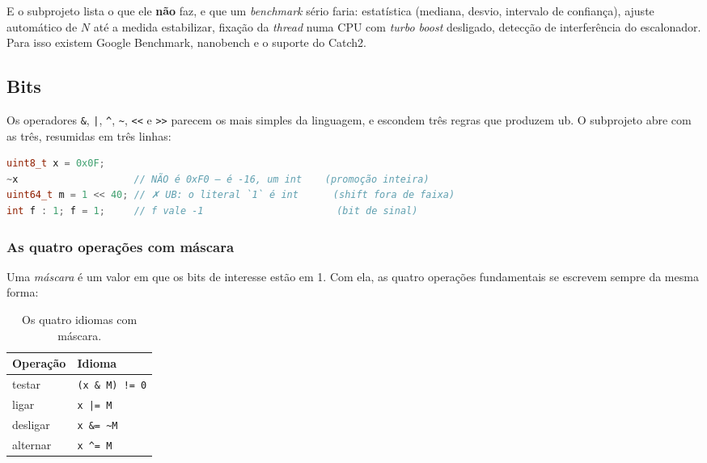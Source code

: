 E o subprojeto lista o que ele \textbf{não} faz, e que um \emph{benchmark} sério
faria: estatística (mediana, desvio, intervalo de confiança), ajuste automático
de $N$ até a medida estabilizar, fixação da \emph{thread} numa CPU com
\emph{turbo boost} desligado, detecção de interferência do escalonador. Para
isso existem Google Benchmark, nanobench e o suporte do Catch2.

\subsection{Bits}
\label{sec:bits}

Os operadores \texttt{\&}, \texttt{|}, \texttt{\textasciicircum},
\texttt{\textasciitilde}, \texttt{<<} e \texttt{>>} parecem os mais simples da
linguagem, e escondem três regras que produzem \gls{ub}. O subprojeto
 abre com as três, resumidas em três linhas:

\begin{lstlisting}[style=bt, language=C++,
    caption={As três armadilhas dos operadores de bit.}]
uint8_t x = 0x0F;
~x                    // NÃO é 0xF0 — é -16, um int    (promoção inteira)
uint64_t m = 1 << 40; // ✗ UB: o literal `1` é int      (shift fora de faixa)
int f : 1; f = 1;     // f vale -1                       (bit de sinal)
\end{lstlisting}

\subsubsection{As quatro operações com máscara}

Uma \emph{máscara} é um valor em que os bits de interesse estão em 1. Com ela,
as quatro operações fundamentais se escrevem sempre da mesma forma:

\begin{table}[htbp]
\centering
\caption{Os quatro idiomas com máscara.}
\label{tab:mascaras}
\footnotesize
\begin{tabular}{@{}ll@{}}
\toprule
\textbf{Operação} & \textbf{Idioma} \\
\midrule
testar   & \texttt{(x \& M) != 0} \\
ligar    & \texttt{x |= M} \\
desligar & \texttt{x \&= \textasciitilde M} \\
alternar & \texttt{x \textasciicircum= M} \\
\bottomrule
\end{tabular}
\end{table}

